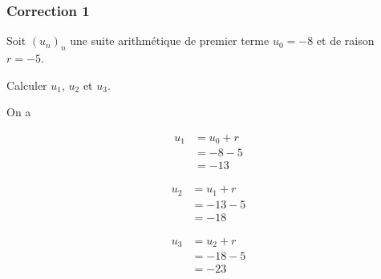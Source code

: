 \documentclass[15pt, mathserif]{beamer}
\begin{document}
\begin{frame}
\vspace{-10mm}
	\frametitle{Correction 1}
Soit $(u_n)_n$ une suite arithmétique de premier terme $u_0=-8$ et de raison $r=-5$. 
 
 Calculer $u_1$, $u_2$ et $u_3$. 
 
 On a 
 \begin{minipage}{0.25\textwidth} 
 
 \begin{align*} 
 u_1 &= u_0+r \\ &= -8-5 \\ &=-13
 \end{align*} 
  
 \end{minipage} \hfil \begin{minipage}{0.25\textwidth} 
 
 \begin{align*} 
 u_2 &= u_1+r \\ &= -13-5 \\ &=-18
 \end{align*} 
 
 \end{minipage} \hfil \begin{minipage}{0.25\textwidth} 
 
 \begin{align*} 
 u_3 &= u_2+r \\ &= -18-5 \\ &=-23
 \end{align*} 
 
 \end{minipage} 
\end{frame}
\end{document}

